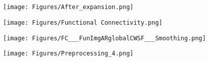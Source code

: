 \section*{}

   \centering 
   \begin{figure}[ht]
    \centering
    \begin{minipage}{0.24\linewidth}
        \texttt{[image: Figures/After\_expansion.png]}
         \captionsetup{font=small} %
    \end{minipage}
    \hfill
    \begin{minipage}{0.14\linewidth}
        \texttt{[image: Figures/Functional Connectivity.png]}
        \captionsetup{font=small} %
        \label{fig:image2}
    \end{minipage}
    \hfill
    \begin{minipage}{0.20\linewidth}
        \texttt{[image: Figures/FC\_\_\_FunImgARglobalCWSF\_\_\_Smoothing.png]}
        \captionsetup{font=small} %
        \label{fig:image3}
    \end{minipage}
    \hfill
    \begin{minipage}{0.38\linewidth}
        \texttt{[image: Figures/Preprocessing\_4.png]}
        \captionsetup{font=small} %
        \label{fig:image4}
    \end{minipage}
\end{figure}



    

